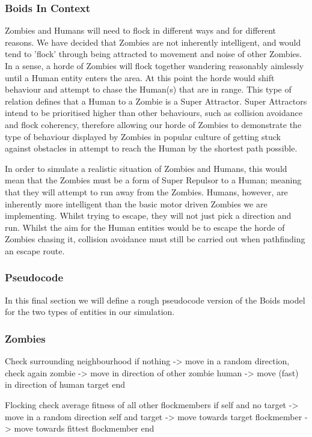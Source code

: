 \subsubsection{Boids In Context}
Zombies and Humans will need to flock in different ways and for different reasons. We have decided that Zombies are not inherently intelligent, and would tend to 'flock' through being attracted to movement and noise of other Zombies. In a sense, a horde of Zombies will flock together wandering reasonably aimlessly until a Human entity enters the area. At this point the horde would shift behaviour and attempt to chase the Human(s) that are in range. This type of relation defines that a Human to a Zombie is a Super Attractor. Super Attractors intend to be prioritised higher than other behaviours, such as collision avoidance and flock coherency, therefore allowing our horde of Zombies to demonstrate the type of behaviour displayed by Zombies in popular culture of getting stuck against obstacles in attempt to reach the Human by the shortest path possible.

In order to simulate a realistic situation of Zombies and Humans, this would mean that the Zombies must be a form of Super Repulsor to a Human; meaning that they will attempt to run away from the Zombies. Humans, however, are inherently more intelligent than the basic motor driven Zombies we are implementing. Whilst trying to escape, they will not just pick a direction and run. Whilst the aim for the Human entities would be to escape the horde of Zombies chasing it, collision avoidance must still be carried out when pathfinding an escape route. 

\subsubsection{Pseudocode}
In this final section we will define a rough pseudocode version of the Boids model for the two types of entities in our simulation.

\subsubsection{Zombies}
Check surrounding neighbourhood
if	nothing 	->	move in a random direction, check again
	zombie 		->	move in direction of other zombie
	human 		->	move (fast) in direction of human target
end

Flocking
	check average fitness of all other flockmembers
	if 	self and no target 	->	move in a random direction
		self and target		-> 	move towards target
		flockmember 		-> 	move towards fittest flockmember
	end
